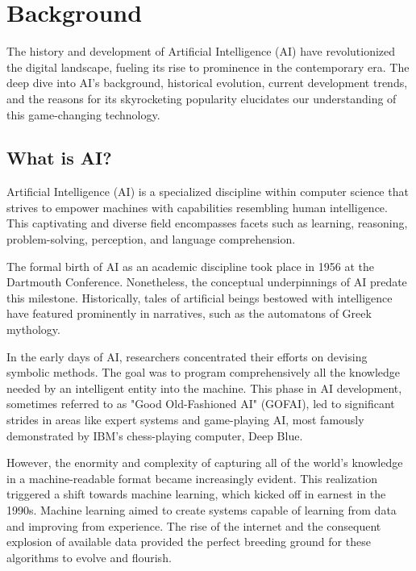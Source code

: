 \documentclass[12pt]{article}
\numberwithin{figure}{section}
\begin{document}
\tableofcontents
\clearpage
\section{Background}
The history and development of Artificial Intelligence (AI) have revolutionized the digital landscape, fueling its rise to prominence in the contemporary era. The deep dive into AI's background, historical evolution, current development trends, and the reasons for its skyrocketing popularity elucidates our understanding of this game-changing technology.

\subsection{What is AI?}
Artificial Intelligence (AI) is a specialized discipline within computer science that strives to empower machines with capabilities resembling human intelligence. This captivating and diverse field encompasses facets such as learning, reasoning, problem-solving, perception, and language comprehension.

The formal birth of AI as an academic discipline took place in 1956 at the Dartmouth Conference. Nonetheless, the conceptual underpinnings of AI predate this milestone. Historically, tales of artificial beings bestowed with intelligence have featured prominently in narratives, such as the automatons of Greek mythology.

In the early days of AI, researchers concentrated their efforts on devising symbolic methods. The goal was to program comprehensively all the knowledge needed by an intelligent entity into the machine. This phase in AI development, sometimes referred to as "Good Old-Fashioned AI" (GOFAI), led to significant strides in areas like expert systems and game-playing AI, most famously demonstrated by IBM's chess-playing computer, Deep Blue.

However, the enormity and complexity of capturing all of the world's knowledge in a machine-readable format became increasingly evident. This realization triggered a shift towards machine learning, which kicked off in earnest in the 1990s. Machine learning aimed to create systems capable of learning from data and improving from experience. The rise of the internet and the consequent explosion of available data provided the perfect breeding ground for these algorithms to evolve and flourish.
\end{document}
